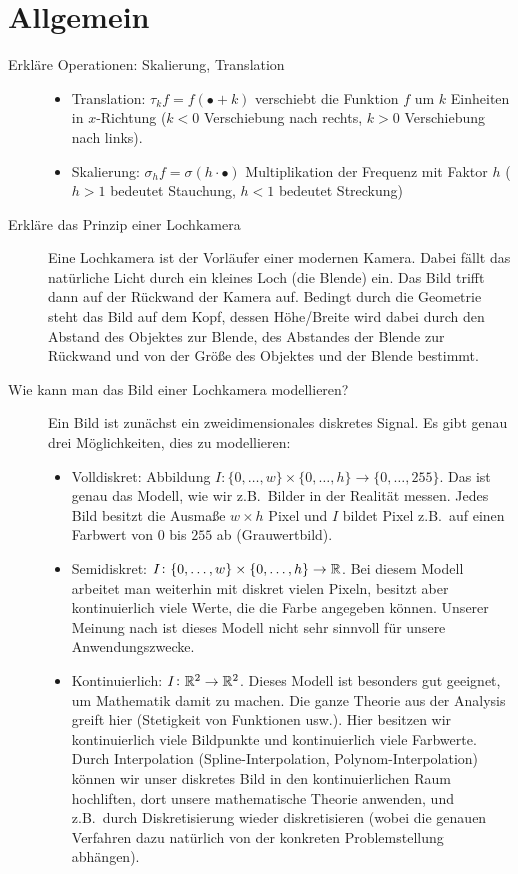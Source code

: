 \section{Allgemein} 
\begin{description}
	\item[Erkläre Operationen: Skalierung, Translation]\leavevmode
  	\begin{itemize}
  	\item Translation: $ \tau_{k}f = f(\bullet + k) $ verschiebt die Funktion $ f $ um $ k $ 
  	Einheiten in $ x $-Richtung ($ k < 0 $ Verschiebung nach rechts, $ k > 0 $ Verschiebung nach 
  	links).
    \item Skalierung: $ \sigma_{h}f = \sigma(h \cdot \bullet) $ Multiplikation der Frequenz mit
    Faktor $ h $ ($ h > 1 $ bedeutet Stauchung, $ h < 1 $ bedeutet Streckung)
  	\end{itemize}
	\item[Erkläre das Prinzip einer Lochkamera]
      Eine Lochkamera ist der Vorläufer einer modernen Kamera. Dabei fällt
      das natürliche Licht durch ein kleines Loch (die Blende) ein. Das Bild
      trifft dann auf der Rückwand der Kamera auf. Bedingt durch die Geometrie
      steht das Bild auf dem Kopf, dessen Höhe/Breite wird dabei durch den
      Abstand des Objektes zur Blende, des Abstandes der Blende zur Rückwand
      und von der Größe des Objektes und der Blende bestimmt.
  \item [Wie kann man das Bild einer Lochkamera modellieren?] Ein Bild ist zunächst ein
    zweidimensionales diskretes Signal. Es gibt genau drei Möglichkeiten, dies zu modellieren:
    \begin{itemize}
    \item Volldiskret: Abbildung 
      $ I \colon \{ 0, \dots, w \} \times \{ 0, \dots, h \} \rightarrow \{ 0, \dots, 255 \} $.
      Das ist genau das Modell, wie wir z.B.\ Bilder in der Realität messen. Jedes Bild besitzt
      die Ausmaße $ w \times h $ Pixel und $ I $ bildet Pixel z.B.\ auf einen Farbwert von $ 0 $
      bis $ 255 $ ab (Grauwertbild).
    \item Semidiskret:
      $ I \colon \{ 0, \dots, w \} \times \{ 0, \dots, h \} \rightarrow \mathbb{R} $. Bei diesem Modell
      arbeitet man weiterhin mit diskret vielen Pixeln, besitzt aber kontinuierlich viele Werte,
      die die Farbe angegeben können. Unserer Meinung nach ist dieses Modell nicht sehr sinnvoll
      für unsere Anwendungszwecke.
    \item Kontinuierlich: $ I \colon \mathbb{R}^{2} \rightarrow \mathbb{R}^{2} $. Dieses Modell ist besonders gut
      geeignet, um Mathematik damit zu machen. Die ganze Theorie aus der Analysis greift hier
      (Stetigkeit von Funktionen usw.). Hier besitzen wir kontinuierlich viele Bildpunkte und
      kontinuierlich viele Farbwerte. Durch Interpolation (Spline-Interpolation,
      Polynom-Interpolation) können wir unser diskretes Bild in den kontinuierlichen Raum 
      hochliften, dort unsere mathematische Theorie anwenden, und z.B.\ durch Diskretisierung
      wieder diskretisieren (wobei die genauen Verfahren dazu natürlich von der konkreten
      Problemstellung abhängen).
    \end{itemize}
\end{description}	

